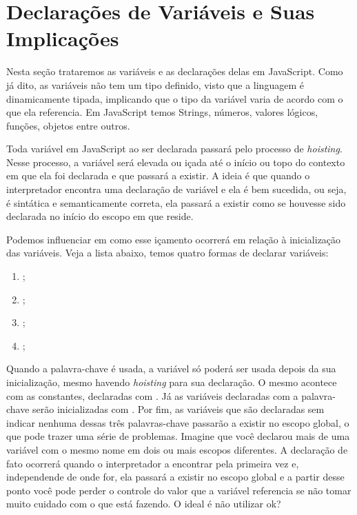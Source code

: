 \section{Declarações de Variáveis e Suas Implicações}

Nesta seção trataremos as variáveis e as declarações delas em JavaScript. Como já dito, as variáveis não tem um tipo definido, visto que a linguagem é dinamicamente tipada, implicando que o tipo da variável varia de acordo com o que ela referencia. Em JavaScript temos Strings, números, valores lógicos, funções, objetos entre outros.

Toda variável em JavaScript ao ser declarada passará pelo processo de \textit{hoisting}. Nesse processo, a variável será elevada ou içada até o início ou topo do contexto em que ela foi declarada e que passará a existir. A ideia é que quando o interpretador encontra uma declaração de variável e ela é bem sucedida, ou seja, é sintática e semanticamente correta, ela passará a existir como se houvesse sido declarada no início do escopo em que reside.

Podemos influenciar em como esse içamento ocorrerá em relação à inicialização das variáveis. Veja a lista abaixo, temos quatro formas de declarar variáveis:

\begin{enumerate}
    \item {};
    \item {};
    \item {};
    \item {};
\end{enumerate}

Quando a palavra-chave  é usada, a variável só poderá ser usada depois da sua inicialização, mesmo havendo \textit{hoisting} para sua declaração. O mesmo acontece com as constantes, declaradas com . Já as variáveis declaradas com a palavra-chave  serão inicializadas com . Por fim, as variáveis que são declaradas sem indicar nenhuma dessas três palavras-chave passarão a existir no escopo global, o que pode trazer uma série de problemas. Imagine que você declarou mais de uma variável com o mesmo nome em dois ou mais escopos diferentes. A declaração de fato ocorrerá quando o interpretador a encontrar pela primeira vez e, independende de onde for, ela passará a existir no escopo global e a partir desse ponto você pode perder o controle do valor que a variável referencia se não tomar muito cuidado com o que está fazendo. O ideal é não utilizar ok?

